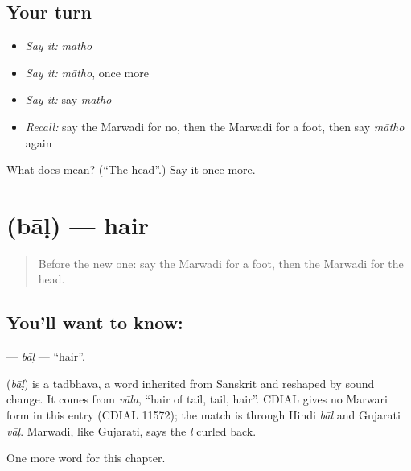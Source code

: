 \subsection*{Your turn}
\begin{itemize}
\raggedright
  \item \emph{Say it:} \emph{mātho}
  \item \emph{Say it:} \emph{mātho}, once more
  \item \emph{Say it:} say \emph{mātho}
  \item \emph{Recall:} say the Marwadi for no, then the Marwadi for a foot, then say \emph{mātho} again
\end{itemize}

\begin{tcolorbox}[breakable,colback=teal!4,colframe=teal!35!black,title={Before you move on}]
What does  mean? (\textquotedblleft{}The head\textquotedblright{}.) Say it once more.
\end{tcolorbox}
\section[\texorpdfstring{\mw{बाळ} (bāḷ)}{बाळ (bāḷ)}]{ (bāḷ) — hair}

\label{lesson:MW-C44-bal}



\begin{quote}
Before the new one: say the Marwadi for a foot, then the Marwadi for the head.
\end{quote}

\subsection*{You'll want to know: }
\textbf{} — \emph{bāḷ} — \textquotedblleft{}hair\textquotedblright{}.

\begin{cousinweb}
\textbf{} (\emph{bāḷ}) is a tadbhava, a word inherited from Sanskrit and reshaped by sound change. It comes from \emph{vāla}, \textquotedblleft{}hair of tail, tail, hair\textquotedblright{}. CDIAL gives no Marwari form in this entry (CDIAL 11572); the match is through Hindi \emph{bāl} and Gujarati \emph{vāḷ}. Marwadi, like Gujarati, says the \emph{l} curled back.
\end{cousinweb}

\begin{grammarlens}[title={What you've built}]
One more word for this chapter.
\end{grammarlens}

